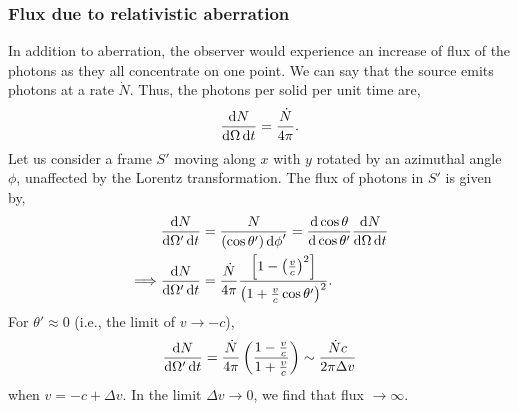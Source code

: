 \documentclass{book}
\begin{document}
\subsubsection{Flux due to relativistic aberration}
In addition to aberration, the observer would experience an increase of flux of the photons as they all concentrate on one point. We can say that the source emits photons at a rate $\Dot{N}$. Thus, the photons per solid per unit time are,
\begin{equation}
	\dv{N}{\Omega\dd{t}} = \frac{\Dot{N}}{4\pi}.
\end{equation}
Let us consider a frame $S'$ moving along $x$ with $y$ rotated by an azimuthal angle $\phi$, unaffected by the Lorentz transformation. The flux of photons in $S'$ is given by,
\begin{equation}
	\begin{split}
		& \dv{N}{\Omega'\dd{t}} = \frac{N}{\left(\cos\theta'\right)\dd{\phi}'} = \dv{\cos\theta}{\cos\theta'}\dv{N}{\Omega\dd{t}} \\
		\implies & \dv{N}{\Omega'\dd{t}} = \frac{\Dot{N}}{4\pi}\frac{\left[1 - \left(\frac{v}{c}\right)^2\right]}{\left(1 + \frac{v}{c}\cos\theta'\right)^2}.
	\end{split}
\end{equation}
For $\theta' \approx 0$ (i.e., the limit of $v \to -c$),
\begin{equation}
	\dv{N}{\Omega'\dd{t}} = \frac{\Dot{N}}{4\pi}\left(\frac{1- \frac{v}{c}}{1 + \frac{v}{c}}\right) \sim \frac{\Dot{N}c}{2\pi\Delta v}
\end{equation}
when $v = -c + \Delta v$. In the limit $\Delta v \to 0$, we find that flux $\to \infty$.
\end{document}
